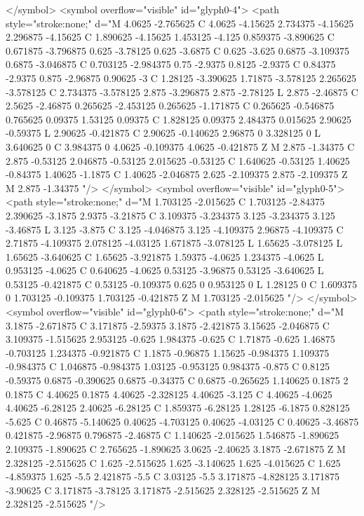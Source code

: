 </symbol>
<symbol overflow="visible" id="glyph0-4">
<path style="stroke:none;" d="M 4.0625 -2.765625 C 4.0625 -4.15625 2.734375 -4.15625 2.296875 -4.15625 C 1.890625 -4.15625 1.453125 -4.125 0.859375 -3.890625 C 0.671875 -3.796875 0.625 -3.78125 0.625 -3.6875 C 0.625 -3.625 0.6875 -3.109375 0.6875 -3.046875 C 0.703125 -2.984375 0.75 -2.9375 0.8125 -2.9375 C 0.84375 -2.9375 0.875 -2.96875 0.90625 -3 C 1.28125 -3.390625 1.71875 -3.578125 2.265625 -3.578125 C 2.734375 -3.578125 2.875 -3.296875 2.875 -2.78125 L 2.875 -2.46875 C 2.5625 -2.46875 0.265625 -2.453125 0.265625 -1.171875 C 0.265625 -0.546875 0.765625 0.09375 1.53125 0.09375 C 1.828125 0.09375 2.484375 0.015625 2.90625 -0.59375 L 2.90625 -0.421875 C 2.90625 -0.140625 2.96875 0 3.328125 0 L 3.640625 0 C 3.984375 0 4.0625 -0.109375 4.0625 -0.421875 Z M 2.875 -1.34375 C 2.875 -0.53125 2.046875 -0.53125 2.015625 -0.53125 C 1.640625 -0.53125 1.40625 -0.84375 1.40625 -1.1875 C 1.40625 -2.046875 2.625 -2.109375 2.875 -2.109375 Z M 2.875 -1.34375 "/>
</symbol>
<symbol overflow="visible" id="glyph0-5">
<path style="stroke:none;" d="M 1.703125 -2.015625 C 1.703125 -2.84375 2.390625 -3.1875 2.9375 -3.21875 C 3.109375 -3.234375 3.125 -3.234375 3.125 -3.46875 L 3.125 -3.875 C 3.125 -4.046875 3.125 -4.109375 2.96875 -4.109375 C 2.71875 -4.109375 2.078125 -4.03125 1.671875 -3.078125 L 1.65625 -3.078125 L 1.65625 -3.640625 C 1.65625 -3.921875 1.59375 -4.0625 1.234375 -4.0625 L 0.953125 -4.0625 C 0.640625 -4.0625 0.53125 -3.96875 0.53125 -3.640625 L 0.53125 -0.421875 C 0.53125 -0.109375 0.625 0 0.953125 0 L 1.28125 0 C 1.609375 0 1.703125 -0.109375 1.703125 -0.421875 Z M 1.703125 -2.015625 "/>
</symbol>
<symbol overflow="visible" id="glyph0-6">
<path style="stroke:none;" d="M 3.1875 -2.671875 C 3.171875 -2.59375 3.1875 -2.421875 3.15625 -2.046875 C 3.109375 -1.515625 2.953125 -0.625 1.984375 -0.625 C 1.71875 -0.625 1.46875 -0.703125 1.234375 -0.921875 C 1.1875 -0.96875 1.15625 -0.984375 1.109375 -0.984375 C 1.046875 -0.984375 1.03125 -0.953125 0.984375 -0.875 C 0.8125 -0.59375 0.6875 -0.390625 0.6875 -0.34375 C 0.6875 -0.265625 1.140625 0.1875 2 0.1875 C 4.40625 0.1875 4.40625 -2.328125 4.40625 -3.125 C 4.40625 -4.0625 4.40625 -6.28125 2.40625 -6.28125 C 1.859375 -6.28125 1.28125 -6.1875 0.828125 -5.625 C 0.46875 -5.140625 0.40625 -4.703125 0.40625 -4.03125 C 0.40625 -3.46875 0.421875 -2.96875 0.796875 -2.46875 C 1.140625 -2.015625 1.546875 -1.890625 2.109375 -1.890625 C 2.765625 -1.890625 3.0625 -2.40625 3.1875 -2.671875 Z M 2.328125 -2.515625 C 1.625 -2.515625 1.625 -3.140625 1.625 -4.015625 C 1.625 -4.859375 1.625 -5.5 2.421875 -5.5 C 3.03125 -5.5 3.171875 -4.828125 3.171875 -3.90625 C 3.171875 -3.78125 3.171875 -2.515625 2.328125 -2.515625 Z M 2.328125 -2.515625 "/>
